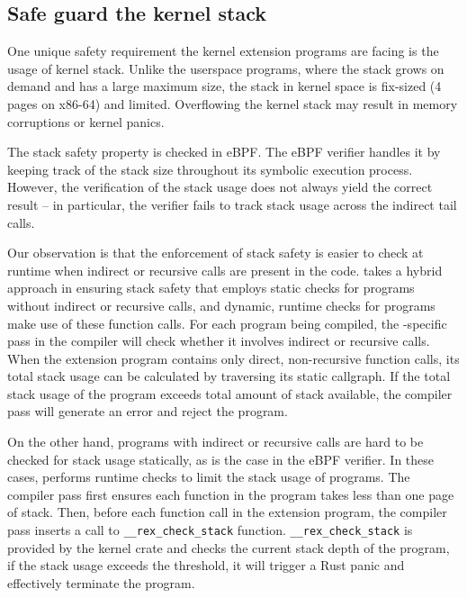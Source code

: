 \subsection{Safe guard the kernel stack}
One unique safety requirement the kernel extension programs are facing is the
    usage of kernel stack.
Unlike the userspace programs, where the stack grows on demand and has a large
    maximum size,
    the stack in kernel space is fix-sized (4 pages on x86-64) and limited.
Overflowing the kernel stack may result in memory corruptions or kernel panics.

The stack safety property is checked in eBPF.
The eBPF verifier handles it by keeping track of the stack size throughout its
    symbolic execution process.
However, the verification of the stack usage does not always yield the correct
    result -- in particular, the verifier fails to track stack usage across the
    indirect tail calls.

Our observation is that the enforcement of stack safety is easier to check at
    runtime when indirect or recursive calls are present in the code.
\projname{} takes a hybrid approach in ensuring stack safety that employs
    static checks for programs without indirect or recursive calls, and
    dynamic, runtime checks for programs make use of these function calls.
For each program being compiled, the \projname{}-specific pass in the compiler
    will check whether it involves indirect or recursive calls.
When the extension program contains only direct, non-recursive function calls,
    its total stack usage can be calculated by traversing its static callgraph.
If the total stack usage of the program exceeds total amount of stack
    available, the \projname{} compiler pass will generate an error and reject
    the program.

On the other hand, programs with indirect or recursive calls are hard to be
    checked for stack usage statically, as is the case in the eBPF verifier.
In these cases, \projname{} performs runtime checks to limit the stack usage of
    programs.
The \projname{} compiler pass first ensures each function in the program takes
    less than one page of stack.
Then, before each function call in the extension program, the \projname{}
    compiler pass inserts a call to \texttt{\_\_rex\_check\_stack} function.
\texttt{\_\_rex\_check\_stack} is provided by the kernel crate and checks the
    current stack depth of the program, if the stack usage exceeds the
    threshold, it will trigger a Rust panic and effectively terminate the
    program.

